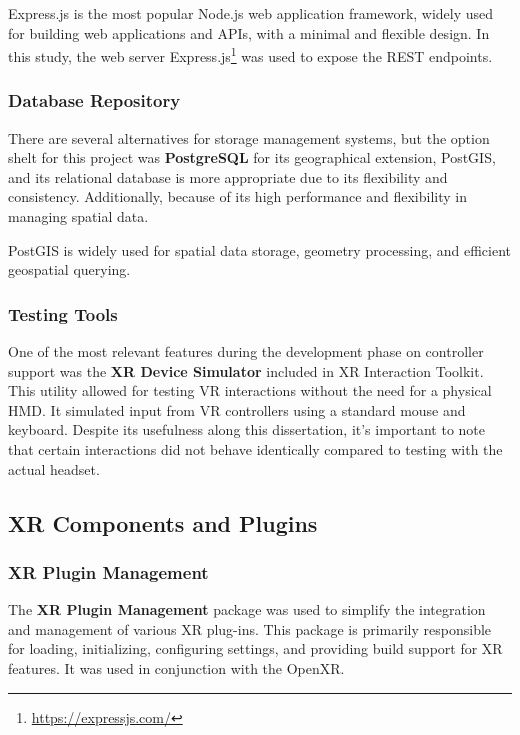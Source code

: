 Express.js is the most popular Node.js web application framework, widely used for building web applications and \gls{API}s, with a minimal and flexible design.
In this study, the web server Express.js\footnote{\url{https://expressjs.com/}} was used to expose the REST endpoints.


\subsubsection{Database Repository}
\label{sec:repos}

There are several alternatives for storage management systems, but the option shelt for this project was \textbf{PostgreSQL} for its geographical extension, PostGIS, and its relational database is more appropriate due to its flexibility and consistency.
Additionally, because of its high performance and flexibility in managing spatial data. 

PostGIS is widely used for spatial data storage, geometry processing, and efficient geospatial querying.

\subsubsection{Testing Tools}

One of the most relevant features during the development phase on controller support was the \textbf{XR Device Simulator} included in XR Interaction Toolkit. 
This utility allowed for testing \gls{VR} interactions without the need for a physical \gls{HMD}. 
It simulated input from \gls{VR} controllers using a standard mouse and keyboard. 
Despite its usefulness along this dissertation, it's important to note that certain interactions did not behave identically compared to testing with the actual headset.


\subsection{XR Components and Plugins}
\subsubsection{XR Plugin Management}
The \textbf{XR Plugin Management} package was used to simplify the integration and management of various XR plug-ins. 
This package is primarily responsible for loading, initializing, configuring settings, and providing build support for XR features. 
It was used in conjunction with the OpenXR.

